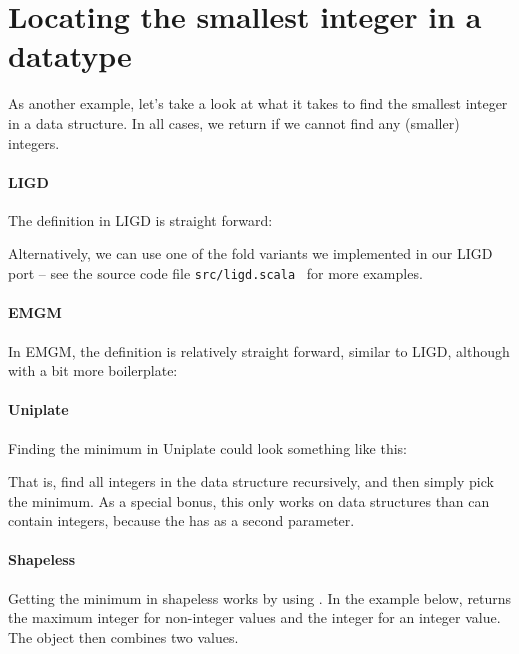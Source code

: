 \section{Locating the smallest integer in a datatype}
As another example, let's take a look at what it takes to find the smallest
integer in a data structure. In all cases, we return  if we cannot
find any (smaller) integers.

\paragraph{LIGD} The definition in LIGD is straight forward:


Alternatively, we can use one of the fold variants we implemented in our LIGD
port -- see the source code file \texttt{src/ligd.scala}~\cite{src} for more examples.

\paragraph{EMGM} In EMGM, the definition is relatively straight forward, similar
to LIGD, although with a bit more boilerplate:



\paragraph{Uniplate}

Finding the minimum in Uniplate could look something like this:



That is, find all integers in the data structure recursively, and then
simply pick the minimum. As a special bonus, this only works on data structures
than can contain integers, because the  has  as a second
parameter.
\paragraph{Shapeless}
Getting the minimum in shapeless works by using . In the example
below,  returns the maximum integer for non-integer values and the
integer for an integer value. The  object then combines two values.

